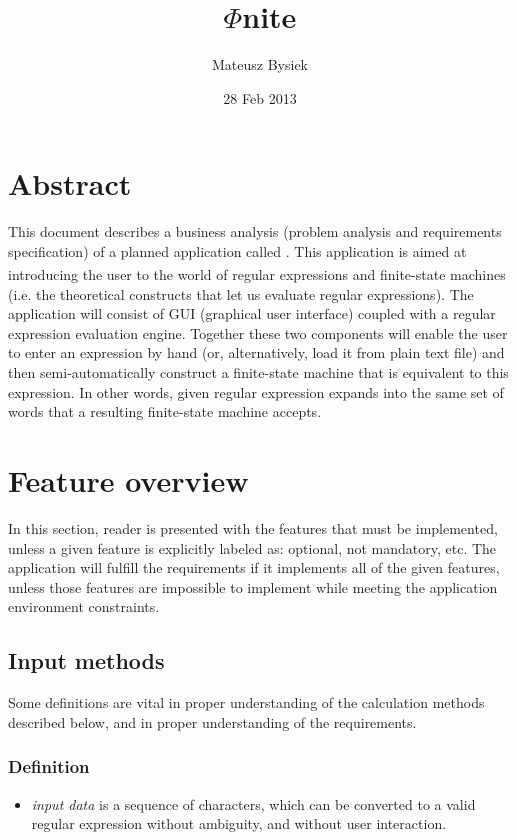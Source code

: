 \documentclass{article}
\title{$\Phi$nite}
\author{Mateusz Bysiek}
\date{28 Feb 2013}
\begin{document}


\section*{Abstract}

This document describes a business analysis (problem analysis and requirements specification) of a
planned application called \titletext. This application is aimed at introducing the user to the
world of regular expressions\textsuperscript{\cite{wiki_rl}} and finite-state
machines\textsuperscript{\cite{wiki_fsm}} (i.e. the theoretical constructs that let us evaluate
regular expressions). The application will consist of GUI (graphical user interface) coupled with a
regular expression evaluation engine. Together these two components will enable the user to enter an
expression by hand (or, alternatively, load it from plain text file) and then semi-automatically
construct a finite-state machine that is equivalent to this expression. In other words, given
regular expression expands into the same set of words that a resulting finite-state machine accepts.

\section{Feature overview}
In this section, reader is presented with the features that must be implemented, unless a given
feature is explicitly labeled as: optional, not mandatory, etc. The application will fulfill the
requirements if it implements all of the given features, unless those features are impossible to
implement while meeting the application environment constraints.

\subsection{Input methods}
Some definitions are vital in proper understanding of the calculation methods described below, and
in proper understanding of the requirements.

\subsubsection*{Definition}
\begin{itemize}

  \item \textit{input data} is a sequence of characters, which can be converted to a valid regular
  expression without ambiguity, and without user interaction.

\end{itemize}
\end{document}
